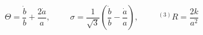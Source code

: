\begin{equation}\label{definequantity}
\Theta=\frac{\dot{b}}{b}+\frac{2\dot{a}}{a}, \hspace{1cm}
\sigma=\frac{1}{\sqrt{3}}(\frac{\dot{b}}{b}-\frac{\dot{a}}{a}),
\hspace{1cm} ^{(3)}R=\frac{2k}{a^2}
\end{equation}


